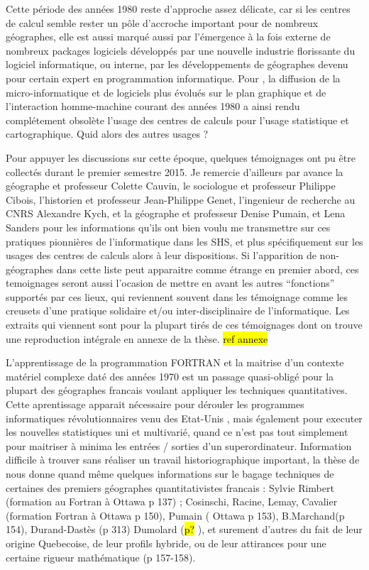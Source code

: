 Cette période des années 1980 reste d'approche assez délicate, car si les centres de calcul semble rester un pôle d'accroche important pour de nombreux géographes, elle est aussi marqué aussi par l’émergence à la fois externe de nombreux packages logiciels développés par une nouvelle industrie florissante du logiciel informatique, ou interne, par les développements de géographes devenu pour certain expert en programmation informatique. Pour \autocites[444]{Joliveau2004}{Waniez2010}, la diffusion de la micro-informatique et de logiciels plus évolués sur le plan graphique et de l’interaction homme-machine courant des années 1980 a ainsi rendu complétement obsolète l’usage des centres de calculs pour l’usage statistique et cartographique. Quid alors des autres usages ?

Pour appuyer les discussions sur cette époque, quelques témoignages ont pu être collectés durant le premier semestre 2015. Je remercie d'ailleurs par avance la géographe et professeur Colette Cauvin, le sociologue et professeur Philippe Cibois, l'historien et professeur Jean-Philippe Genet, l'ingenieur de recherche au CNRS Alexandre Kych, et la géographe et professeur Denise Pumain, et Lena Sanders pour les informations qu'ils ont bien voulu me transmettre sur ces pratiques pionnières de l'informatique dans les SHS, et plus spécifiquement sur les usages des centres de calculs alors à leur dispositions. Si l'apparition de non-géographes dans cette liste peut apparaitre comme étrange en premier abord, ces temoignages seront aussi l'ocasion de mettre en avant les autres \enquote{fonctions} supportés par ces lieux, qui reviennent souvent dans les témoignage comme les creusets d'une pratique solidaire et/ou inter-disciplinaire de l'informatique. Les extraits qui viennent sont pour la plupart tirés de ces témoignages dont on trouve une reproduction intégrale en annexe de la thèse. \hl{ref annexe}

L'apprentissage de la programmation FORTRAN et la maitrise d'un contexte matériel complexe daté des années 1970 est un passage quasi-obligé pour la plupart des géographes francais voulant appliquer les techniques quantitatives. Cette aprentissage apparait nécessaire pour dérouler les programmes informatiques révolutionnaires venu des Etat-Unis \autocite[150,127]{Cuyala2014}, mais également pour executer les nouvelles statistiques uni et multivarié, quand ce n’est pas tout simplement pour maitriser à minima les entrées / sorties d’un superordinateur. Information difficile à trouver sans réaliser un travail historiographique important, la thèse de \textcite{Cuyala2014} nous donne quand même quelques informations sur le bagage techniques de certaines des premiers géographes quantitativistes francais : Sylvie Rimbert (formation au Fortran à Ottawa p 137) ;  Cosinschi, Racine, Lemay, Cavalier (formation Fortran à Ottawa p 150), Pumain ( Ottawa p 153), B.Marchand(p 154), Durand-Dastès (p 313) Dumolard (\hl{p?} ), et surement d’autres du fait de leur origine Quebecoise, de leur profils hybride, ou de leur attirances pour une certaine rigueur mathématique (p 157-158).

